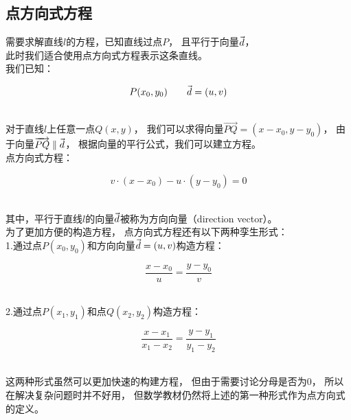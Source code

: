 \documentclass[UTF8]{ctexart}
\let\nvec\vec
\def\vec#1{\nvec{\vphantom b\smash{#1}}}
\begin{document}
\subsection{点方向式方程}
    需要求解直线$l$的方程，已知直线过点$P$，
    且平行于向量$\vec d$，\\[1mm]
    此时我们适合使用点方向式方程表示这条直线。\\[3mm]
    我们已知：
    \begin{large}
        \begin{equation*}
            P(x_{0},y_{0})\qquad
            \vec d = (u,v)
        \end{equation*}
    \end{large}\\
    对于直线$l$上任意一点$Q(x,y)$，
    我们可以求得向量$\overrightarrow{PQ}=(x-x_0,y-y_0)$，
    由于向量$\overrightarrow{PQ}\parallel \vec{d}$，
    根据向量的平行公式，我们可以建立方程。\\[3mm]
    点方向式方程：
    \begin{large}
        \begin{equation*}
            v\cdot(x-x_{0})-u\cdot(y-y_0)=0
        \end{equation*}
    \end{large}\\
    其中，平行于直线$l$的向量$\vec d$被称为方向向量（direction vector）。\\[5mm]
    为了更加方便的构造方程，
    点方向式方程还有以下两种孪生形式：\\[3mm]
    1.通过点$P(x_0,y_0)$和方向向量$\vec{d}=(u,v)$构造方程：
    \vspace{5pt}
    \begin{large}
        \begin{equation*}
            \frac{x-x_0}{u}=\frac{y-y_0}{v}
        \end{equation*}
    \end{large}\\
    2.通过点$P(x_1,y_1)$和点$Q(x_2,y_2)$构造方程：
    \vspace{5pt}
    \begin{large}
        \begin{equation*}
            \frac{x-x_1}{x_1-x_2}=\frac{y-y_1}{y_1-y_2}
        \end{equation*}
    \end{large}\\[1mm]
    这两种形式虽然可以更加快速的构建方程，
    但由于需要讨论分母是否为0，
    所以在解决复杂问题时并不好用，
    但数学教材仍然将上述的第一种形式作为点方向式的定义。
\end{document}
